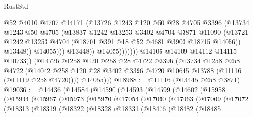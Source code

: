 \begin{lexlean}{RustStd}
\begin{coremodule}
                                  @52
                                  @4010
                                  @4707
                                  @14171
                                  (@13726
                                    @1243
                                    @120
                                    @50
                                    @28
                                    @4705
                                    @3396
                                    (@13734
                                      @1243
                                      @50
                                      @4705
                                      (@13837
                                        @1242
                                        @13253
                                        @3402
                                        @4704
                                        @3871
                                        @11090
                                        (@13721
                                          @1242
                                          @13253
                                          @4704
                                          (@18701 @391 @18 @52 @4681 @3903 @18715 @14056))
                                        @13448))
                                    @14055)))
                              @13448))
                          @14055)))))))
            @14106
            @14109
            @14112
            @14115
            @10733))
        (@13726
          @1258
          @120
          @258
          @28
          @4722
          @3396
          (@13734
            @1258
            @258
            @4722
            (@14042 @258 @120 @28 @3402 @3396 @4720 @10645 @13788 (@11116 (@11119 @258 @4720))))
          @14055)))
@18988 := @11116 (@13445 @258 @3871)
@19036 := @14436
    (@14584
      (@14590
        (@14593
          (@14599
            (@14602
              (@15958
                (@15964
                  (@15967
                    (@15973
                      (@15976
                        (@17054
                          (@17060
                            (@17063
                              (@17069
                                (@17072
                                  (@18313
                                    (@18319
                                      (@18322
                                        (@18328
                                          (@18331
                                            (@18476
                                              (@18482
                                                (@18485

\end{coremodule}
\end{lexlean}
